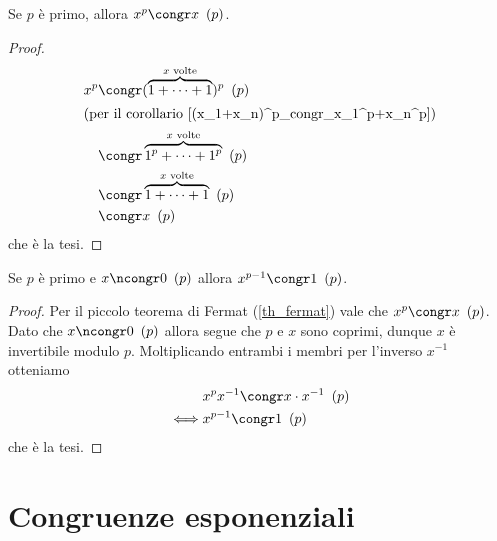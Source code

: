 \begin{theorem}
     \label{th_fermat}
    Se $p$ è primo, allora $x^p \congr x \Mod{p}$.
\end{theorem}
\begin{proof}
    \begin{alignat*}{1}
        x^p &\congr (\overbrace{1 +\dots+ 1}^{x \text{ volte}})^p \Mod{p}\\
        \intertext{(per il corollario \ref{(x_1+x_n)^p_congr_x_1^p+x_n^p})}
        &\congr \overbrace{1^p +\dots+ 1^p}^{x \text{ volte}} \Mod{p}\\
        &\congr \overbrace{1 +\dots+ 1}^{x \text{ volte}} \Mod{p}\\
        &\congr x \Mod{p}
    \end{alignat*}
    che è la tesi.
\end{proof}

\begin{corollary} \label{corollario_fermat}
    Se $p$ è primo e $x \ncongr 0 \Mod{p}$ allora $x^{p-1} \congr 1 \Mod{p}$.
\end{corollary}
\begin{proof}
    Per il piccolo teorema di Fermat (\ref{th_fermat}) vale che $x^p \congr x \Mod{p}$. Dato che $x \ncongr 0 \Mod{p}$ allora segue che $p$ e $x$ sono coprimi, dunque $x$ è invertibile modulo $p$. Moltiplicando entrambi i membri per l'inverso $x^{-1}$ otteniamo \begin{alignat*}
        {1}
        &x^px^{-1} \congr x\cdot x^{-1} \Mod{p}\\
        \iff &x^{p-1} \congr 1 \Mod{p}
    \end{alignat*}
    che è la tesi.    
\end{proof}

\section{Congruenze esponenziali}


